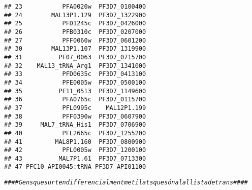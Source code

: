\documentclass[12pt, a4paper]{article}\usepackage[]{graphicx}\usepackage[]{color}
\makeatletter
\newcommand{\hlcom}[1]{\textcolor[rgb]{0.678,0.584,0.686}{\textit{#1}}}%
\newenvironment{kframe}{%
 \def\at@end@of@kframe{}%
 \ifinner\ifhmode%
  \def\at@end@of@kframe{\end{minipage}}%
  \begin{minipage}{\columnwidth}%
 \fi\fi%
 \def\FrameCommand##1{\hskip\@totalleftmargin \hskip-\fboxsep
 \colorbox{shadecolor}{##1}\hskip-\fboxsep
     \hskip-\linewidth \hskip-\@totalleftmargin \hskip\columnwidth}%
 \MakeFramed {\advance\hsize-\width
   \@totalleftmargin\z@ \linewidth\hsize
   \@setminipage}}%
 {\par\unskip\endMakeFramed%
 \at@end@of@kframe}
\newenvironment{knitrout}{}{} %
\makeatother
\begin{document}
\begin{knitrout}
\begin{kframe}
\begin{verbatim}
## 23           PFA0020w  PF3D7_0100400
## 24        MAL13P1.129  PF3D7_1322900
## 25           PFD1245c  PF3D7_0426000
## 26           PFB0310c  PF3D7_0207000
## 27           PFF0060w  PF3D7_0601200
## 30        MAL13P1.107  PF3D7_1319900
## 31          PF07_0063  PF3D7_0715700
## 32    MAL13_tRNA_Arg1  PF3D7_1341000
## 33           PFD0635c  PF3D7_0413100
## 34           PFE0005w  PF3D7_0500100
## 35          PF11_0513  PF3D7_1149600
## 36           PFA0765c  PF3D7_0115700
## 37           PFL0995c    MAL12P1.199
## 38           PFF0390w  PF3D7_0607900
## 39     MAL7_tRNA_His1  PF3D7_0706900
## 40           PFL2665c  PF3D7_1255200
## 41         MAL8P1.160  PF3D7_0800900
## 42           PFL0005w  PF3D7_1200100
## 43          MAL7P1.61  PF3D7_0713300
## 47 PFC10_API0045:tRNA PF3D7_API01100
\end{verbatim}
\begin{alltt}
\hlcom{#### Gens que surten differencialment metilats que són a la llista de trans ####}


\end{alltt}
\end{kframe}
\end{knitrout}
\end{document}
